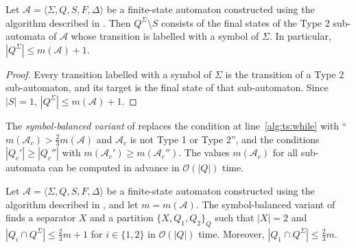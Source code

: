 \begin{proposition}\label{prop:thompson_essential}
  Let $\mathcal{A} = \langle \Sigma, Q, S, F, \Delta \rangle$ be a finite-state
  automaton constructed using the algorithm described in . Then
  $Q^\Sigma \setminus S$ consists of the final states of the Type 2 sub-automata of
  $\mathcal{A}$ whose transition is labelled with a symbol of $\Sigma$. In particular,
  $|Q^\Sigma| \leq m(\mathcal{A}) + 1$.
\end{proposition}

\begin{proof}
  Every transition labelled with a symbol of $\Sigma$ is the transition of a Type 2
  sub-automaton, and its target is the final state of that sub-automaton. Since $|S| =
  1$, $|Q^\Sigma| \leq m(\mathcal{A}) + 1$.
\end{proof}

The \emph{symbol-balanced variant} of  replaces the
condition at line~\ref{alg:ts:while} with ``$m(\mathcal{A}_c) > \frac{2}{3}
m(\mathcal{A})$ and $\mathcal{A}_c$ is not Type 1 or Type 2'', and the conditions
$|Q_c'| \geq |Q_c''|$ with $m(\mathcal{A}_c') \geq m(\mathcal{A}_c'')$. The values
$m(\mathcal{A}_c)$ for all sub-automata can be computed in advance in $\mathcal{O}(|Q|)$
time.

\begin{theorem}\label{thm:thompson_separator_symbols}
  Let $\mathcal{A} = \langle \Sigma, Q, S, F, \Delta \rangle$ be a finite-state
  automaton constructed using the algorithm described in , and let
  $m = m(\mathcal{A})$. The symbol-balanced variant of 
  finds a separator $X$ and a partition $\{ X, Q_1, Q_2 \}_Q$ such that $|X| = 2$ and
  $|Q_i \cap Q^\Sigma| \leq \frac{2}{3} m + 1$ for $i \in \{ 1, 2 \}$ in $\mathcal{O}(|Q|)$
  time. Moreover, $|Q_1 \cap Q^\Sigma| \leq \frac{2}{3} m$.
\end{theorem}

